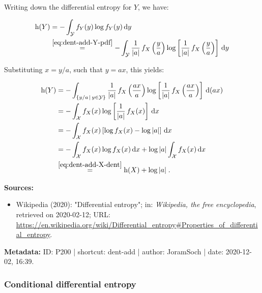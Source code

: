 \documentclass[a4paper,12pt,twoside]{book}
\begin{document}
Writing down the differential entropy for $Y$, we have:

\begin{equation} \label{eq:dent-add-Y-dent-s1}
\begin{split}
\mathrm{h}(Y) &= - \int_{\mathcal{Y}} f_Y(y) \log f_Y(y) \, \mathrm{d}y \\
&\overset{\eqref{eq:dent-add-Y-pdf}}{=} - \int_{\mathcal{Y}} \frac{1}{|a|} \, f_X\left(\frac{y}{a}\right) \log \left[ \frac{1}{|a|} \, f_X\left(\frac{y}{a}\right) \right] \, \mathrm{d}y
\end{split}
\end{equation}

Substituting $x = y/a$, such that $y = ax$, this yields:

\begin{equation} \label{eq:dent-add-Y-dent-s2}
\begin{split}
\mathrm{h}(Y) &= - \int_{\left\lbrace y/a \,|\, y \in {\mathcal{Y}} \right\rbrace} \frac{1}{|a|} \, f_X\left(\frac{ax}{a}\right) \log \left[ \frac{1}{|a|} \, f_X\left(\frac{ax}{a}\right) \right] \, \mathrm{d}(ax) \\
&= - \int_{\mathcal{X}} f_X(x) \log \left[ \frac{1}{|a|} \, f_X(x) \right] \, \mathrm{d}x \\
&= - \int_{\mathcal{X}} f_X(x) \left[ \log f_X(x) - \log |a| \right] \, \mathrm{d}x \\
&= - \int_{\mathcal{X}} f_X(x) \log f_X(x) \, \mathrm{d}x + \log |a| \int_{\mathcal{X}} f_X(x) \, \mathrm{d}x \\
&\overset{\eqref{eq:dent-add-X-dent}}{=} \mathrm{h}(X) + \log |a| \; .
\end{split}
\end{equation}


\vspace{1em}
\textbf{Sources:}
\begin{itemize}
\item Wikipedia (2020): "Differential entropy"; in: \textit{Wikipedia, the free encyclopedia}, retrieved on 2020-02-12; URL: \url{https://en.wikipedia.org/wiki/Differential_entropy#Properties_of_differential_entropy}.
\end{itemize}


\vspace{1em}
\textbf{Metadata:} ID: P200 | shortcut: dent-add | author: JoramSoch | date: 2020-12-02, 16:39.
\vspace{1em}



\subsubsection[\textit{Conditional differential entropy}]{Conditional differential entropy} \label{sec:dent-cond}
\setcounter{equation}{0}
\end{document}
